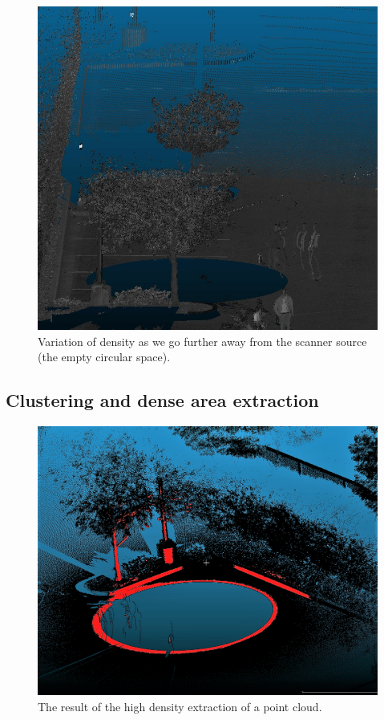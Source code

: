 \begin{figure}
  \centering
  \includegraphics[scale=0.7]{img/dens.jpg}
  \caption{Variation of density as we go further away from the scanner source (the empty circular space).}
  \label{fig:density}
\end{figure}


\subsection{Clustering and dense area extraction}
\label{subsc:highdens}
\begin{figure}
  \centering
  \includegraphics[scale=0.44]{img/highdens.png}
  \caption{The result of the high density extraction of a point cloud.}
  \label{fig:highdens}
\end{figure}

